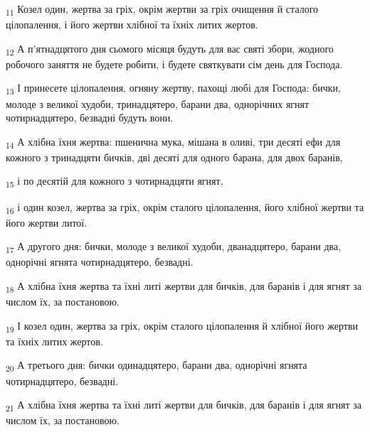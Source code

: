 \begin{tcolorbox}
\textsubscript{11} Козел один, жертва за гріх, окрім жертви за гріх очищення й сталого цілопалення, і його жертви хлібної та їхніх литих жертов.
\end{tcolorbox}
\begin{tcolorbox}
\textsubscript{12} А п'ятнадцятого дня сьомого місяця будуть для вас святі збори, жодного робочого заняття не будете робити, і будете святкувати сім день для Господа.
\end{tcolorbox}
\begin{tcolorbox}
\textsubscript{13} І принесете цілопалення, огняну жертву, пахощі любі для Господа: бички, молоде з великої худоби, тринадцятеро, барани два, однорічних ягнят чотирнадцятеро, безвадні будуть вони.
\end{tcolorbox}
\begin{tcolorbox}
\textsubscript{14} А хлібна їхня жертва: пшенична мука, мішана в оливі, три десяті ефи для кожного з тринадцяти бичків, дві десяті для одного барана, для двох баранів,
\end{tcolorbox}
\begin{tcolorbox}
\textsubscript{15} і по десятій для кожного з чотирнадцяти ягнят,
\end{tcolorbox}
\begin{tcolorbox}
\textsubscript{16} і один козел, жертва за гріх, окрім сталого цілопалення, його хлібної жертви та його жертви литої.
\end{tcolorbox}
\begin{tcolorbox}
\textsubscript{17} А другого дня: бички, молоде з великої худоби, дванадцятеро, барани два, однорічні ягнята чотирнадцятеро, безвадні.
\end{tcolorbox}
\begin{tcolorbox}
\textsubscript{18} А хлібна їхня жертва та їхні литі жертви для бичків, для баранів і для ягнят за числом їх, за постановою.
\end{tcolorbox}
\begin{tcolorbox}
\textsubscript{19} І козел один, жертва за гріх, окрім сталого цілопалення й хлібної його жертви та їхніх литих жертов.
\end{tcolorbox}
\begin{tcolorbox}
\textsubscript{20} А третього дня: бички одинадцятеро, барани два, однорічні ягнята чотирнадцятеро, безвадні.
\end{tcolorbox}
\begin{tcolorbox}
\textsubscript{21} А хлібна їхня жертва та їхні литі жертви для бичків, для баранів і для ягнят за числом їх, за постановою.
\end{tcolorbox}
